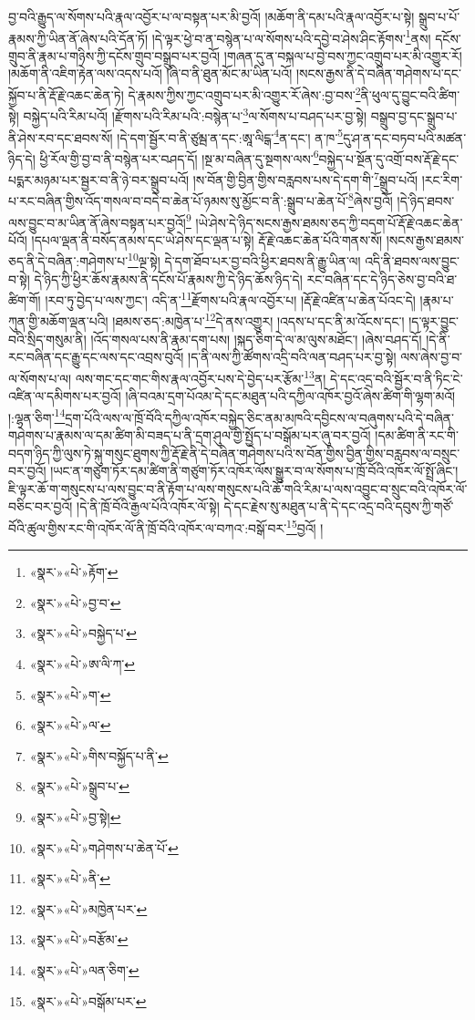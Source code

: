 བྱ་བའི་རྒྱུད་ལ་སོགས་པའི་རྣལ་འབྱོར་པ་ལ་བསྟན་པར་མི་བྱའོ། །མཆོག་ནི་དམ་པའི་རྣལ་འབྱོར་པ་སྟེ། སྒྲུབ་པ་པོ་རྣམས་ཀྱི་ཡིན་ནོ་ཞེས་པའི་དོན་ཏོ། །དེ་ལྟར་ཕྱེ་བ་ན་བསྙེན་པ་ལ་སོགས་པའི་དབྱེ་བ་ཤེས་ཤིང་རྟོགས་\footnote{«སྣར་»«པེ་»རྟོག་}ནས། དངོས་གྲུབ་ནི་རྣམ་པ་གཉིས་ཀྱི་དངོས་གྲུབ་བསྒྲུབ་པར་བྱའོ། །གཞན་དུ་ན་བསྐལ་པ་བྱེ་བས་ཀྱང་འགྲུབ་པར་མི་འགྱུར་རོ། །མཆོག་ནི་འཇིག་རྟེན་ལས་འདས་པའོ། །ཞི་བ་ནི་ཐུན་མོང་མ་ཡིན་པའོ། །སངས་རྒྱས་ནི་དེ་བཞིན་གཤེགས་པ་དང་སྐྱོབ་པ་ནི་རྡོ་རྗེ་འཆང་ཆེན་ཏེ། དེ་རྣམས་ཀྱིས་ཀྱང་འགྲུབ་པར་མི་འགྱུར་རོ་ཞེས་:བྱ་བས་\footnote{«སྣར་»«པེ་»བྱ་བ་}ནི་ཕུལ་དུ་བྱུང་བའི་ཚིག་སྟེ། བསྐྱེད་པའི་རིམ་པའོ། །རྫོགས་པའི་རིམ་པའི་:བསྙེན་པ་\footnote{«སྣར་»«པེ་»བསྐྱེད་པ་}ལ་སོགས་པ་བཤད་པར་བྱ་སྟེ། བསྒྲུབ་བྱ་དང་སྒྲུབ་པ་ནི་ཤེས་རབ་དང་ཐབས་སོ། །དེ་དག་སྦྱོར་བ་ནི་ཙུམྦ་ན་དང་:ཨཱ་ལིངྒ་\footnote{«སྣར་»«པེ་»ཨ་ལི་ཀ་}ན་དང་། ན་ཁ་\footnote{«སྣར་»«པེ་»ག་}དུ་ཤ་ན་དང་བཏབ་པའི་མཚན་ཉིད་དེ། ཕྱི་རོལ་གྱི་བྱ་བ་ནི་བསྙེན་པར་བཤད་དོ། །སྔ་མ་བཞིན་དུ་སྔགས་ལས་\footnote{«སྣར་»«པེ་»ལ་}བསྐྱེད་པ་སྔོན་དུ་འགྲོ་བས་རྡོ་རྗེ་དང་པདྨར་མཉམ་པར་སྦྱར་བ་ནི་ཉེ་བར་སྒྲུབ་པའོ། །ས་བོན་གྱི་བྱིན་གྱིས་བརླབས་པས་དེ་དག་གི་\footnote{«སྣར་»«པེ་»གིས་བསྐྱོད་པ་ནི་}སྒྲུབ་པའོ། །རང་རིག་པ་རང་བཞིན་གྱིས་འོད་གསལ་བ་བདེ་བ་ཆེན་པོ་ཉམས་སུ་མྱོང་བ་ནི་:སྒྲུབ་པ་ཆེན་པོ་\footnote{«སྣར་»«པེ་»སྒྲུབ་པ་}ཞེས་བྱའོ། །དེ་ཉིད་ཐབས་ལས་བྱུང་བ་མ་ཡིན་ནོ་ཞེས་བསྟན་པར་བྱའོ།\footnote{«སྣར་»«པེ་»བྱ་སྟེ།} །ཡེ་ཤེས་དེ་ཉིད་སངས་རྒྱས་ཐམས་ཅད་ཀྱི་བདག་པོ་རྡོ་རྗེ་འཆང་ཆེན་པོའོ། །དཔལ་ལྡན་ནི་བསོད་ནམས་དང་ཡེ་ཤེས་དང་ལྡན་པ་སྟེ། རྡོ་རྗེ་འཆང་ཆེན་པོའི་གནས་སོ། །སངས་རྒྱས་ཐམས་ཅད་ནི་དེ་བཞིན་:གཤེགས་པ་\footnote{«སྣར་»«པེ་»གཤེགས་པ་ཆེན་པོ་}ལྔ་སྟེ། དེ་དག་ཐོབ་པར་བྱ་བའི་ཕྱིར་ཐབས་ནི་རྒྱུ་ཡིན་ལ། འདི་ནི་ཐབས་ལས་བྱུང་བ་སྟེ། དེ་ཉིད་ཀྱི་ཕྱིར་ཆོས་རྣམས་ནི་དངོས་པོ་རྣམས་ཀྱི་དེ་ཉིད་ཆོས་ཉིད་དེ། རང་བཞིན་དང་དེ་ཉིད་ཅེས་བྱ་བའི་ཐ་ཚིག་གོ། །རབ་ཏུ་བྱེད་པ་ལས་ཀྱང་། འདི་ན་\footnote{«སྣར་»«པེ་»ནི་}རྫོགས་པའི་རྣལ་འབྱོར་པ། །རྡོ་རྗེ་འཛིན་པ་ཆེན་པོའང་དེ། །རྣམ་པ་ཀུན་གྱི་མཆོག་ལྡན་པའི། །ཐམས་ཅད་:མཁྱེན་པ་\footnote{«སྣར་»«པེ་»མཁྱེན་པར་}དེ་ནས་འགྱུར། །འདས་པ་དང་ནི་མ་འོངས་དང་། །ད་ལྟར་བྱུང་བའི་སྲིད་གསུམ་ནི། །འོད་གསལ་པས་ནི་རྣམ་དག་པས། །སྐད་ཅིག་དེ་ལ་མ་ལུས་མཐོང་། །ཞེས་བཤད་དོ། །དེ་ནི་རང་བཞིན་དང་རྒྱུ་དང་ལས་དང་འབྲས་བུའོ། །ད་ནི་ལས་ཀྱི་ཚོགས་འདྲི་བའི་ལན་བཤད་པར་བྱ་སྟེ། ལས་ཞེས་བྱ་བ་ལ་སོགས་པ་ལ། ལས་གང་དང་གང་གིས་རྣལ་འབྱོར་པས་དེ་བྱེད་པར་རྩོམ་\footnote{«སྣར་»«པེ་»བརྩོམ་}ན། དེ་དང་འདྲ་བའི་སྦྱོར་བ་ནི་ཏིང་ངེ་འཛིན་ལ་དམིགས་པར་བྱའོ། །ཞི་བའམ་དྲག་པོའམ་དེ་དང་མཐུན་པའི་དཀྱིལ་འཁོར་བྱའོ་ཞེས་ཚིག་གི་ལྷག་མའོ། །:ལྷན་ཅིག་\footnote{«སྣར་»«པེ་»ལན་ཅིག་}དྲག་པོའི་ལས་ལ་ཁྲོ་བོའི་དཀྱིལ་འཁོར་བསྐྱེད་ཅིང་ནམ་མཁའི་དབྱིངས་ལ་བཞུགས་པའི་དེ་བཞིན་གཤེགས་པ་རྣམས་ལ་དམ་ཚིག་མི་བཟད་པ་ནི་དྲག་ཤུལ་གྱི་སྤྱོད་པ་བསྒོམ་པར་ཞུ་བར་བྱའོ། །དམ་ཚིག་ནི་རང་གི་བདག་ཉིད་ཀྱི་ལུས་ཏེ་སྐུ་གསུང་ཐུགས་ཀྱི་རྡོ་རྗེ་ནི་དེ་བཞིན་གཤེགས་པའི་ས་བོན་གྱིས་བྱིན་གྱིས་བརླབས་ལ་བསྲུང་བར་བྱའོ། །ཡང་ན་གཙུག་ཏོར་དམ་ཚིག་ནི་གཙུག་ཏོར་འཁོར་ལོས་སྒྱུར་བ་ལ་སོགས་པ་ཁྲོ་བོའི་འཁོར་ལོ་སྤྲོ་ཞིང་། ཇི་ལྟར་ཆོ་ག་གསུངས་པ་ལས་བྱུང་བ་ནི་རྟོག་པ་ལས་གསུངས་པའི་ཆོ་གའི་རིམ་པ་ལས་འབྱུང་བ་སྲུང་བའི་འཁོར་ལོ་བཅིང་བར་བྱའོ། །དེ་ནི་ཁྲོ་བོའི་རྒྱལ་པོའི་འཁོར་ལོ་སྟེ། དེ་དང་རྗེས་སུ་མཐུན་པ་ནི་དེ་དང་འདྲ་བའི་དབུས་ཀྱི་གཙོ་བོའི་ཚུལ་གྱིས་རང་གི་འཁོར་ལོ་ནི་ཁྲོ་བོའི་འཁོར་ལ་བཀའ་:བསྒོ་བར་\footnote{«སྣར་»«པེ་»བསྒོམ་པར་}བྱའོ། །
